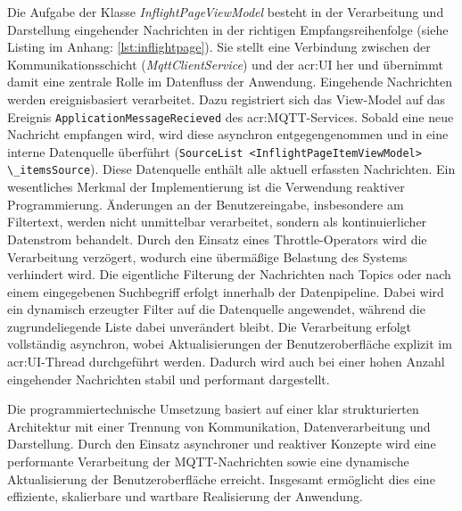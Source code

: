     Die Aufgabe der Klasse \textit{InflightPageViewModel} besteht in der Verarbeitung und Darstellung eingehender Nachrichten in der richtigen Empfangsreihenfolge (siehe Listing im Anhang: \ref{lst:inflightpage}). Sie stellt eine Verbindung zwischen der Kommunikationsschicht (\textit{MqttClientService}) und der \acrshort{acr:UI} her und übernimmt damit eine zentrale Rolle im Datenfluss der Anwendung. Eingehende Nachrichten werden ereignisbasiert verarbeitet. Dazu registriert sich das View-Model auf das Ereignis \lstinline{ApplicationMessageRecieved} des \acrshort{acr:MQTT}-Services. Sobald eine neue Nachricht empfangen wird, wird diese asynchron entgegengenommen und in eine interne Datenquelle überführt (\lstinline|SourceList <InflightPageItemViewModel> \_itemsSource|). Diese Datenquelle enthält alle aktuell erfassten Nachrichten. Ein wesentliches Merkmal der Implementierung ist die Verwendung reaktiver Programmierung. Änderungen an der Benutzereingabe, insbesondere am Filtertext, werden nicht unmittelbar verarbeitet, sondern als kontinuierlicher Datenstrom behandelt. Durch den Einsatz eines Throttle-Operators wird die Verarbeitung verzögert, wodurch eine übermäßige Belastung des Systems verhindert wird. Die eigentliche Filterung der Nachrichten nach Topics oder nach einem eingegebenen Suchbegriff erfolgt innerhalb der Datenpipeline. Dabei wird ein dynamisch erzeugter Filter auf die Datenquelle angewendet, während die zugrundeliegende Liste dabei unverändert bleibt. Die Verarbeitung erfolgt vollständig asynchron, wobei Aktualisierungen der Benutzeroberfläche explizit im \acrshort{acr:UI}-Thread durchgeführt werden. Dadurch wird auch bei einer hohen Anzahl eingehender Nachrichten stabil und performant dargestellt.

    Die programmiertechnische Umsetzung basiert auf einer klar strukturierten Architektur mit einer Trennung von Kommunikation, Datenverarbeitung und Darstellung. Durch den Einsatz asynchroner und reaktiver Konzepte wird eine performante Verarbeitung der MQTT-Nachrichten sowie eine dynamische Aktualisierung der Benutzeroberfläche erreicht. Insgesamt ermöglicht dies eine effiziente, skalierbare und wartbare Realisierung der Anwendung.

